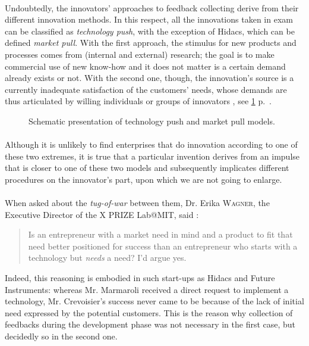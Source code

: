 \documentclass[twoside]{report}
\begin{document}
\paragraph{}
Undoubtedly, the innovators’ approaches to feedback collecting derive from their different innovation methods. In this respect, all the innovations taken in exam can be classified as \emph{technology push}, with the exception of Hidacs, which can be defined \emph{market pull}. With the first approach, the stimulus for new products and processes comes from (internal and external) research; the goal is to make commercial use of new know-how and it does not matter is a certain demand already exists or not. With the second one, though, the innovation’s source is a currently inadequate satisfaction of the customers’ needs, whose demands are thus articulated by willing individuals or groups of innovators \cite{brem2009integration}, see \ref{fig:models} p.~\pageref{fig:models}.
\begin{figure}
\begin{center}
\caption{Schematic presentation of technology push and market pull models.}
\label{fig:models}
\end{center}
\end{figure}
\paragraph{}
Although it is unlikely to find enterprises that do innovation according to one of these two extremes, it is true that a particular invention derives from an impulse that is closer to one of these two models and subsequently implicates different procedures on the innovator’s part, upon which we are not going to enlarge.
\paragraph{}
When asked about the \emph{tug-of-war} between them, Dr. Erika \textsc{Wagner}, the Executive Director of the X PRIZE Lab@MIT, said \cite{awolfson_entrepreneurship_2010} : \begin{quote}Is an entrepreneur with a market need in mind and a product to fit that need better positioned for success than an entrepreneur who starts with a technology but \emph{needs} a need? I’d argue yes.\end{quote} Indeed, this reasoning is embodied in such start-ups as Hidacs and Future Instruments: whereas Mr. Marmaroli received a direct request to implement a technology, Mr. Crevoisier’s success never came to be because of the lack of initial need expressed by the potential customers. This is the reason why collection of feedbacks during the development phase was not necessary in the first case, but decidedly so in the second one.
\end{document}
